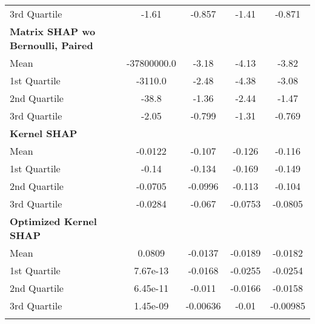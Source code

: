 {\begin{tabular} {lcccc}
\hspace{7pt}3rd Quartile & \cellcolor{silver!60}-1.61 & \cellcolor{gold!60}-0.857 & \cellcolor{gold!60}-1.41 & \cellcolor{gold!60}-0.871 \\ 
\addlinespace[1ex] 
\textbf{Matrix SHAP wo Bernoulli, Paired} &  &  &  &  \\ 
\hspace{7pt}Mean & \cellcolor{gold!60}-37800000.0 & \cellcolor{gold!60}-3.18 & \cellcolor{silver!60}-4.13 & \cellcolor{gold!60}-3.82 \\ 
\hspace{7pt}1st Quartile & \cellcolor{silver!60}-3110.0 & \cellcolor{gold!60}-2.48 & \cellcolor{gold!60}-4.38 & \cellcolor{gold!60}-3.08 \\ 
\hspace{7pt}2nd Quartile & \cellcolor{bronze!60}-38.8 & \cellcolor{silver!60}-1.36 & \cellcolor{gold!60}-2.44 & \cellcolor{silver!60}-1.47 \\ 
\hspace{7pt}3rd Quartile & \cellcolor{gold!60}-2.05 & \cellcolor{silver!60}-0.799 & \cellcolor{silver!60}-1.31 & \cellcolor{silver!60}-0.769 \\ 
\addlinespace[1ex] 
\textbf{Kernel SHAP} &  &  &  &  \\ 
\hspace{7pt}Mean & -0.0122 & -0.107 & -0.126 & -0.116 \\ 
\hspace{7pt}1st Quartile & -0.14 & -0.134 & -0.169 & -0.149 \\ 
\hspace{7pt}2nd Quartile & -0.0705 & -0.0996 & -0.113 & -0.104 \\ 
\hspace{7pt}3rd Quartile & -0.0284 & -0.067 & -0.0753 & -0.0805 \\ 
\addlinespace[1ex] 
\textbf{Optimized Kernel SHAP} &  &  &  &  \\ 
\hspace{7pt}Mean & 0.0809 & -0.0137 & -0.0189 & -0.0182 \\ 
\hspace{7pt}1st Quartile & 7.67e-13 & -0.0168 & -0.0255 & -0.0254 \\ 
\hspace{7pt}2nd Quartile & 6.45e-11 & -0.011 & -0.0166 & -0.0158 \\ 
\hspace{7pt}3rd Quartile & 1.45e-09 & -0.00636 & -0.01 & -0.00985 \\ 
\addlinespace[1ex] 

\end{tabular}}
